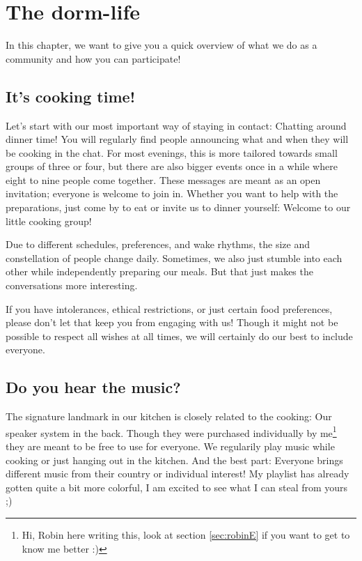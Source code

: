 \chapter{The dorm-life} \label{chap:activities}

In this chapter, we want to give you a quick overview of what we do as a community and how you can participate!

\section{It's cooking time!} \label{sec:cooking}
Let's start with our most important way of staying in contact: Chatting around dinner time! You will regularly find people announcing what and when they will be cooking in the chat. For most evenings, this is more tailored towards small groups of three or four, but there are also bigger events once in a while where eight to nine people come together. These messages are meant as an open invitation; everyone is welcome to join in. Whether you want to help with the preparations, just come by to eat or invite us to dinner yourself: Welcome to our little cooking group!

Due to different schedules, preferences, and wake rhythms, the size and constellation of people change daily. Sometimes, we also just stumble into each other while independently preparing our meals. But that just makes the conversations more interesting. 

If you have intolerances, ethical restrictions, or just certain food preferences, please don't let that keep you from engaging with us! Though it might not be possible to respect all wishes at all times, we will certainly do our best to include everyone.

\section{Do you hear the music?} \label{sec:speakers}
The signature landmark in our kitchen is closely related to the cooking: Our speaker system in the back. Though they were purchased individually by me\footnote{Hi, Robin here writing this, look at section \ref{sec:robinE} if you want to get to know me better :)} they are meant to be free to use for everyone. We regularily play music while cooking or just hanging out in the kitchen. And the best part: Everyone brings different music from their country or individual interest! My playlist has already gotten quite a bit more colorful, I am excited to see what I can steal from yours ;)

